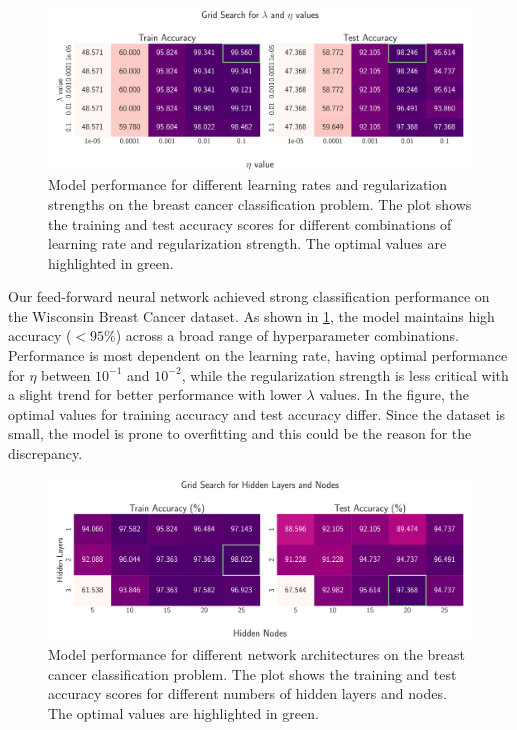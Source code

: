 \documentclass[aps,pra,english,notitlepage,reprint,nofootinbib]{revtex4-1}  %
\begin{document}
\onecolumngrid
\begin{figure}[h!]
    \centering
    \includegraphics[width = .9\textwidth]{../figs/classification_lambda_eta.pdf}
    \caption{Model performance for different learning rates and regularization strengths on the breast cancer classification problem. The plot shows the training and test accuracy scores for different combinations of learning rate and regularization strength. The optimal values are highlighted in green.}
    \label{fig:NN_Classification_lambda_eta}
\end{figure}
\twocolumngrid

Our feed-forward neural network achieved strong classification performance on the Wisconsin Breast Cancer dataset. As shown in \cref{fig:NN_Classification_lambda_eta}, the model maintains high accuracy ($<95\%$) across a broad range of hyperparameter combinations. Performance is most dependent on the learning rate, having optimal performance for $\eta$ between $10^{-1}$ and $10^{-2}$, while the regularization strength is less critical with a slight trend for better performance with lower $\lambda$ values. In the figure, the optimal values for training accuracy and test accuracy differ. Since the dataset is small, the model is prone to overfitting and this could be the reason for the discrepancy.

\onecolumngrid
\begin{figure}[h!]
    \centering
    \includegraphics[width = .9\textwidth]{../figs/classification_hidden_layers_nodes.pdf}
    \caption{Model performance for different network architectures on the breast cancer classification problem. The plot shows the training and test accuracy scores for different numbers of hidden layers and nodes. The optimal values are highlighted in green.}
    \label{fig:NN_Classification_hidden_layers_nodes}
\end{figure}
\twocolumngrid
\end{document}
